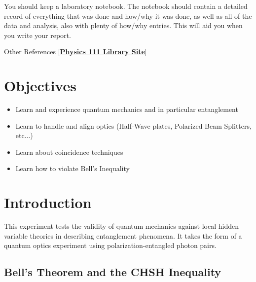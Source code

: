 \documentclass{../lab}
\begin{document}
You should keep a laboratory notebook. The notebook should contain a detailed record of everything that was done and how/why it was done, as well as all of the data and analysis, also with plenty of how/why entries. This will aid you when you write your report.

Other References [\href{http://physics111.lib.berkeley.edu/Physics111/Reprints/QIE/QIE\_index.html}{\textbf{Physics 111 Library Site}}]

\section{Objectives}

\begin{itemize}
    \item Learn and experience quantum mechanics and in particular entanglement

    \item Learn to handle and align optics (Half-Wave plates, Polarized Beam Splitters, etc...)

    \item Learn about coincidence techniques

    \item Learn how to violate Bell's Inequality

\end{itemize}

\section{Introduction}
\label{sec:Introduction}

This experiment tests the validity of quantum mechanics against local hidden variable theories in describing entanglement phenomena. It takes the form of a quantum optics experiment using polarization-entangled photon pairs.

\subsection{Bell's Theorem and the CHSH Inequality}
\end{document}
